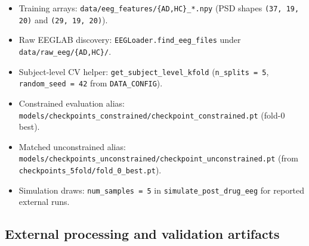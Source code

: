 \begin{itemize}
  \item Training arrays: \texttt{data/\allowbreak{}eeg\_\allowbreak{}features/\allowbreak{}\{AD,HC\}\_\allowbreak{}*.\allowbreak{}npy} (PSD shapes \texttt{(37, 19, 20)} and \texttt{(29, 19, 20)}).
  \item Raw EEGLAB discovery: \texttt{EEGLoader.\allowbreak{}find\_\allowbreak{}eeg\_\allowbreak{}files} under \texttt{data/\allowbreak{}raw\_\allowbreak{}eeg/\allowbreak{}\{AD,HC\}/\allowbreak{}}.
  \item Subject-level CV helper: \texttt{get\_\allowbreak{}subject\_\allowbreak{}level\_\allowbreak{}kfold} (\texttt{n\_\allowbreak{}splits = 5}, \texttt{random\_\allowbreak{}seed = 42} from \texttt{DATA\_CONFIG}).
  \item Constrained evaluation alias: \texttt{models/\allowbreak{}checkpoints\_\allowbreak{}constrained/\allowbreak{}checkpoint\_\allowbreak{}constrained.\allowbreak{}pt} (fold-0 best).
  \item Matched unconstrained alias: \texttt{models/\allowbreak{}checkpoints\_\allowbreak{}unconstrained/\allowbreak{}checkpoint\_\allowbreak{}unconstrained.\allowbreak{}pt} (from \texttt{checkpoints\_\allowbreak{}5fold/\allowbreak{}fold\_\allowbreak{}0\_\allowbreak{}best.\allowbreak{}pt}).
  \item Simulation draws: \texttt{num\_\allowbreak{}samples = 5} in \texttt{simulate\_\allowbreak{}post\_\allowbreak{}drug\_\allowbreak{}eeg} for reported external runs.
\end{itemize}

\subsection{External processing and validation artifacts}

